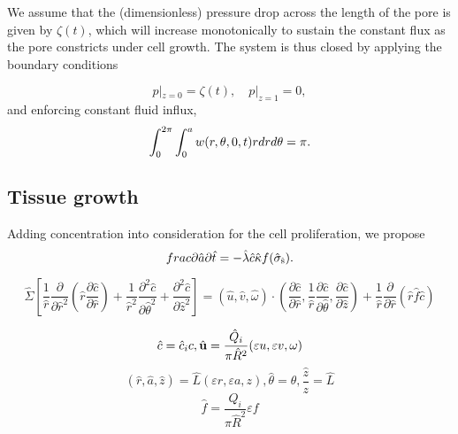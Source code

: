 \documentclass[12pt]{article}
\renewcommand{\(}{\left (}
\renewcommand{\)}{\right )}
\begin{document}
We assume that the (dimensionless) pressure drop across the length of the pore is given by $\zeta (t)$, which will increase monotonically to sustain the constant flux as the pore constricts under cell growth. The system is thus closed by applying the boundary conditions

\begin{equation}
	p|_{z=0}=\zeta(t), \quad p|_{z=1}=0,
	\label{BC:pressure}
\end{equation}
and enforcing constant fluid influx,
\begin{equation}
	\int_0^{2\pi}\int_0^a w{\color{black}(r,\theta,0,t)}rdrd\theta=\pi.
	\label{initial-flux-dimensionless}
\end{equation}

\subsection{Tissue growth}

Adding concentration into consideration for the cell proliferation, we propose
\begin{equation}
	frac{\partial \hat{a}}{ \partial \hat{t}}=-{\hat{\lambda}}\hat{c} \hat{\kappa} f(\hat{\sigma}_{\hat {\rm s}}).
\end{equation}











\begin{equation}
\hat{\Sigma}\left[\frac{1}{\hat{r}} \frac{\partial}{\partial \hat{r}^{2}}\left(\hat{r} \frac{\partial \hat{c}}{\partial \hat{r}}\right) +\frac{1}{\hat{r}^{2}} \frac{\partial^{2} \hat{c}}{\partial \hat{\theta}^{2}}+\frac{\partial^{2} \hat{c}}{\partial \hat{z}^{2}}\right]=\left(\hat{u}, \hat{v}, \hat{\omega}\right) \cdot(\frac{\partial \hat{c}}{\partial\hat{r}}, \frac{1}{\hat{r}}\frac{\partial\hat{c}}{\partial\hat{\theta}},\frac{\partial\hat{c}}{\partial\hat{z}})+\frac{1}{\hat{r}} \frac{\partial}{\partial \hat{r}}(\hat{r} \hat{f} \hat{c})
\end{equation}

\begin{equation}
	\hat{c}=\hat{c}_{i} c, \hat{\bold{u}}=\frac{\hat{Q}_{i}}{\pi \hat{R}^{2}}(\varepsilon u, \varepsilon v, \omega)
\end{equation}
$$(\hat{r}, \hat{a}, \hat{z})=\hat{L}(\varepsilon r, \varepsilon a, z), \hat{\theta}=\theta, \frac{\hat{z}}{z}=\hat{L}$$
$$\hat{f}=\frac{Q_i}{\pi \hat{R}^{2}} \varepsilon f$$
\end{document}
